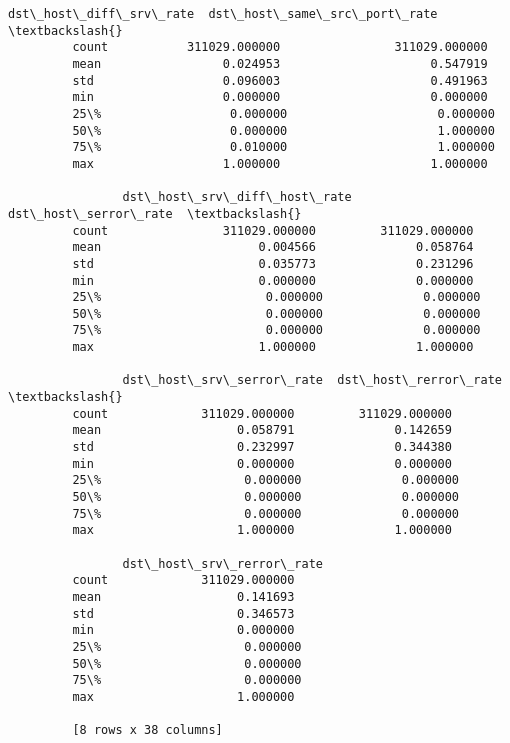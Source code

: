 \documentclass[11pt]{article}
\begin{document}
\begin{Verbatim}[commandchars=\\\{\}]
                dst\_host\_diff\_srv\_rate  dst\_host\_same\_src\_port\_rate  \textbackslash{}
         count           311029.000000                311029.000000   
         mean                 0.024953                     0.547919   
         std                  0.096003                     0.491963   
         min                  0.000000                     0.000000   
         25\%                  0.000000                     0.000000   
         50\%                  0.000000                     1.000000   
         75\%                  0.010000                     1.000000   
         max                  1.000000                     1.000000   
         
                dst\_host\_srv\_diff\_host\_rate  dst\_host\_serror\_rate  \textbackslash{}
         count                311029.000000         311029.000000   
         mean                      0.004566              0.058764   
         std                       0.035773              0.231296   
         min                       0.000000              0.000000   
         25\%                       0.000000              0.000000   
         50\%                       0.000000              0.000000   
         75\%                       0.000000              0.000000   
         max                       1.000000              1.000000   
         
                dst\_host\_srv\_serror\_rate  dst\_host\_rerror\_rate  \textbackslash{}
         count             311029.000000         311029.000000   
         mean                   0.058791              0.142659   
         std                    0.232997              0.344380   
         min                    0.000000              0.000000   
         25\%                    0.000000              0.000000   
         50\%                    0.000000              0.000000   
         75\%                    0.000000              0.000000   
         max                    1.000000              1.000000   
         
                dst\_host\_srv\_rerror\_rate  
         count             311029.000000  
         mean                   0.141693  
         std                    0.346573  
         min                    0.000000  
         25\%                    0.000000  
         50\%                    0.000000  
         75\%                    0.000000  
         max                    1.000000  
         
         [8 rows x 38 columns]
\end{Verbatim}
            
\end{document}
